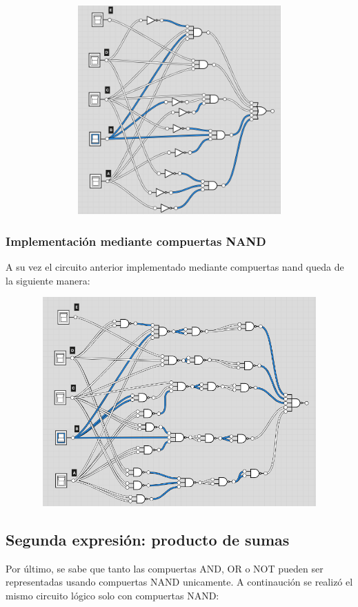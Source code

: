 \begin{figure}[H]
\centering
\includegraphics[width=12cm,height=8cm]{Ejercicio_2/circuitos/Ej2_parte1_logicly.png}
\end{figure}

\subsubsection{Implementación mediante compuertas NAND}
A su vez el circuito anterior implementado mediante compuertas nand queda de la siguiente manera:

\begin{figure}[H]
\centering
\includegraphics[width=12cm,height=8cm]{Ejercicio_2/circuitos/Ej2_parte1_nand_logicly.png}
\end{figure}



\subsection{Segunda expresión: producto de sumas}
Por último, se sabe que tanto las compuertas AND, OR o NOT pueden ser representadas usando compuertas NAND unicamente. A continaución se realizó el mismo circuito lógico solo con compuertas NAND:


